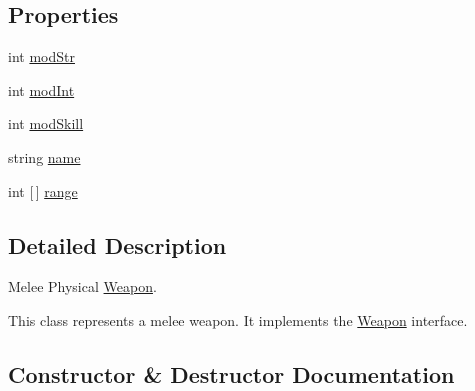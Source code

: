 \subsection*{Properties}
\begin{DoxyCompactItemize}
\item 
int \hyperlink{class_model_1_1_weapon_module_1_1_iron_sword_ae2b8382a3b1cae70238fa408cf615aa7}{mod\+Str}
\item 
int \hyperlink{class_model_1_1_weapon_module_1_1_iron_sword_ab0cfe8f4f6c606284d0e7c91b1696fc7}{mod\+Int}
\item 
int \hyperlink{class_model_1_1_weapon_module_1_1_iron_sword_a81527447c2cdeda0e634bb7ac9c2bb90}{mod\+Skill}
\item 
string \hyperlink{class_model_1_1_weapon_module_1_1_iron_sword_a57f5bf0fb116a9e6208e36dec42736b6}{name}
\item 
int \mbox{[}$\,$\mbox{]} \hyperlink{class_model_1_1_weapon_module_1_1_iron_sword_a0d87a7bfe8e0e2350a18a79525e812d2}{range}
\end{DoxyCompactItemize}


\subsection{Detailed Description}
Melee Physical \hyperlink{interface_model_1_1_weapon_module_1_1_weapon}{Weapon}. 

This class represents a melee weapon. It implements the \hyperlink{interface_model_1_1_weapon_module_1_1_weapon}{Weapon} interface. 

\subsection{Constructor \& Destructor Documentation}
\hypertarget{class_model_1_1_weapon_module_1_1_iron_sword_ab4d225fec1f0784f801740c1a4b65a25}{}\label{class_model_1_1_weapon_module_1_1_iron_sword_ab4d225fec1f0784f801740c1a4b65a25} 

